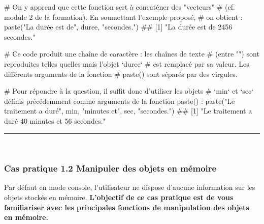 \documentclass[12pt,twosided, notitlepage]{book}
\newenvironment{Shaded}{}{}
\newcommand{\CommentTok}[1]{\textcolor[rgb]{0.00,0.50,0.00}{#1}}
\newcommand{\KeywordTok}[1]{\textcolor[rgb]{0.00,0.00,1.00}{#1}}
\newcommand{\NormalTok}[1]{#1}
\newcommand{\StringTok}[1]{\textcolor[rgb]{0.00,0.50,0.50}{#1}}
\renewenvironment{Shaded}{\begin{snugshade}}{\end{snugshade}}
\begin{document}
\begin{enumerate}
\begin{Shaded}
\begin{Highlighting}[]
\CommentTok{# On y apprend que cette fonction sert à concaténer des "vecteurs"}
\CommentTok{# (cf. module 2 de la formation). En soumettant l'exemple proposé,}
\CommentTok{# on obtient :}
\KeywordTok{paste}\NormalTok{(}\StringTok{"La durée est de"}\NormalTok{, duree, }\StringTok{"secondes."}\NormalTok{)}
\NormalTok{  ## [1] "La durée est de 2456 secondes."}

\CommentTok{# Ce code produit une chaîne de caractère : les chaînes de texte}
\CommentTok{# (entre "") sont reproduites telles quelles mais l'objet `duree`}
\CommentTok{# est remplacé par sa valeur. Les différents arguments de la fonction}
\CommentTok{# paste() sont séparés par des virgules.}

\CommentTok{# Pour répondre à la question, il suffit donc d'utiliser les objets}
\CommentTok{# `min` et `sec` définis précédemment comme arguments de la fonction paste() :}
\KeywordTok{paste}\NormalTok{(}\StringTok{"Le traitement a duré"}\NormalTok{, min, }\StringTok{"minutes et"}\NormalTok{, sec, }\StringTok{"secondes."}\NormalTok{)}
\NormalTok{  ## [1] "Le traitement a duré 40 minutes et 56 secondes."}
\end{Highlighting}
\end{Shaded}

  \begin{center} \rule{0.5\linewidth}{\linethickness}\end{center} 
    \bigskip 
    \fi
\end{enumerate}

~

\hypertarget{cas-pratique-1.2-manipuler-des-objets-en-memoire}{%
\subsubsection{\texorpdfstring{\textbf{Cas pratique 1.2} Manipuler des
objets en
mémoire}{Cas pratique 1.2 Manipuler des objets en mémoire}}\label{cas-pratique-1.2-manipuler-des-objets-en-memoire}}


Par défaut en mode console, l'utilisateur ne dispose d'aucune
information sur les objets stockés en mémoire. \textbf{L'objectif de ce
cas pratique est de vous familiariser avec les principales fonctions de
manipulation des objets en mémoire.}
\end{document}

